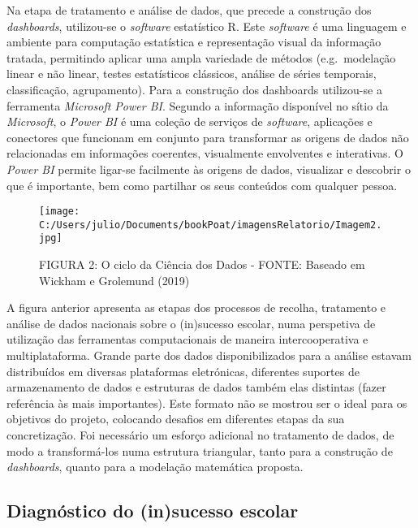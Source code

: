 \documentclass[
]{book}
\begin{document}
Na etapa de tratamento e análise de dados, que precede a construção dos \emph{dashboards}, utilizou-se o \emph{software} estatístico R. Este \emph{software} é uma linguagem e ambiente para computação estatística e representação visual da informação tratada, permitindo aplicar uma ampla variedade de métodos (e.g.~modelação linear e não linear, testes estatísticos clássicos, análise de séries temporais, classificação, agrupamento). Para a construção dos dashboards utilizou-se a ferramenta \emph{Microsoft Power BI}. Segundo a informação disponível no sítio da \emph{Microsoft}, o \emph{Power BI} é uma coleção de serviços de \emph{software}, aplicações e conectores que funcionam em conjunto para transformar as origens de dados não relacionadas em informações coerentes, visualmente envolventes e interativas. O \emph{Power BI} permite ligar-se facilmente às origens de dados, visualizar e descobrir o que é importante, bem como partilhar os seus conteúdos com qualquer pessoa.

\begin{figure}
\centering
\texttt{[image: C:/Users/julio/Documents/bookPoat/imagensRelatorio/Imagem2.jpg]}
\caption{FIGURA 2: O ciclo da Ciência dos Dados - FONTE: Baseado em Wickham e Grolemund (2019)}
\end{figure}

A figura anterior apresenta as etapas dos processos de recolha, tratamento e análise de dados nacionais sobre o (in)sucesso escolar, numa perspetiva de utilização das ferramentas computacionais de maneira intercooperativa e multiplataforma. Grande parte dos dados disponibilizados para a análise estavam distribuídos em diversas plataformas eletrónicas, diferentes suportes de armazenamento de dados e estruturas de dados também elas distintas (fazer referência às mais importantes). Este formato não se mostrou ser o ideal para os objetivos do projeto, colocando desafios em diferentes etapas da sua concretização. Foi necessário um esforço adicional no tratamento de dados, de modo a transformá-los numa estrutura triangular, tanto para a construção de \emph{dashboards}, quanto para a modelação matemática proposta.

\hypertarget{diagnuxf3stico-do-insucesso-escolar}{%
\subsection{\texorpdfstring{\textbf{Diagnóstico do (in)sucesso escolar}}{Diagnóstico do (in)sucesso escolar}}\label{diagnuxf3stico-do-insucesso-escolar}}
\end{document}

